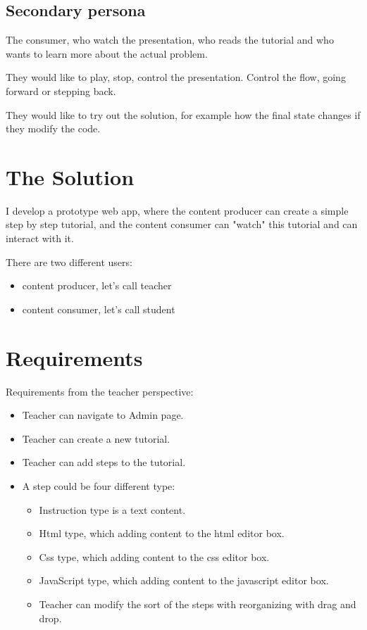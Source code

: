 \subsection{Secondary persona}

The consumer, who watch the presentation, who reads the tutorial and who wants to learn more about the actual problem.

They would like to play, stop, control the presentation. Control the flow, going forward or stepping back.

They would like to try out the solution, for example how the final state changes if they modify the code.

\section{The Solution}

I develop a prototype web app, where the content producer can create a simple step by step tutorial, and the content consumer can "watch" this tutorial and can interact with it.

There are two different users:
\begin{itemize}
\item content producer, let's call teacher
\item content consumer, let's call student
\end{itemize}

\section{Requirements}

Requirements from the teacher perspective:
\begin{itemize}
\item Teacher can navigate to Admin page.
\item Teacher can create a new tutorial.
\item Teacher can add steps to the tutorial.
\item A step could be four different type:
\begin{itemize}
\item Instruction type is a text content.
\item Html type, which adding content to the html editor box.
\item Css type, which adding content to the css editor box.
\item JavaScript type, which adding content to the javascript editor box.
\item Teacher can modify the sort of the steps with reorganizing with drag and drop.
\end{itemize}
\end{itemize}

